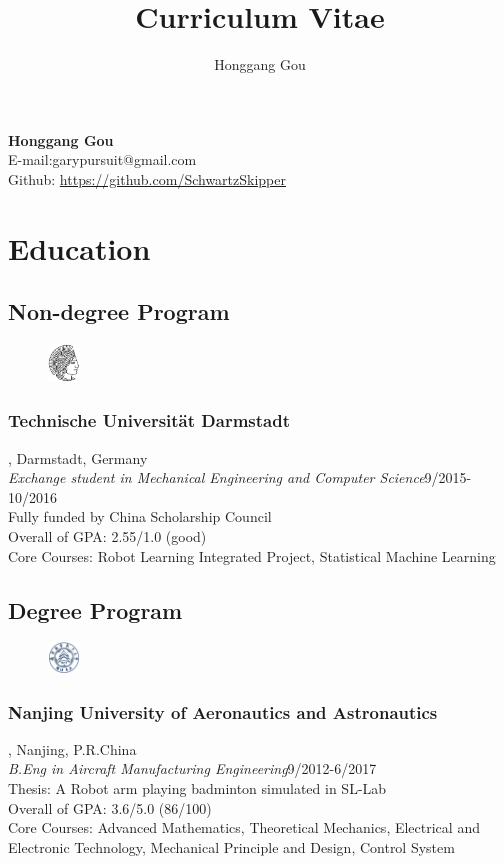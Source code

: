 \documentclass{article}
\makeatletter
\renewcommand{\maketitle}{
\begin{center}
{\Large\bfseries
Honggang Gou\\}
\vspace{0em}
E-mail:garypursuit@gmail.com\\
Github: \url{https://github.com/SchwartzSkipper}
\end{center}
}
\makeatother
\begin{document}
   
\title{Curriculum Vitae}
\author{Honggang Gou}

\maketitle

\section{Education}
\subsection{Non-degree Program}
\begin{figure}
    \begin{center}
        \includegraphics[width=0.075\textwidth]{./pic/tud.png}
    \end{center}
\end{figure}
\subsubsection{Technische Universit\"at Darmstadt}, Darmstadt, Germany\\
\emph{Exchange student in Mechanical Engineering and Computer Science}{\hfill9/2015-10/2016\\}
Fully funded by China Scholarship Council\\
Overall of GPA: 2.55/1.0 (good)\\
Core Courses: Robot Learning Integrated Project, Statistical Machine Learning\\
\subsection{Degree Program}
\begin{figure}
    \begin{center}
        \includegraphics[width=0.075\textwidth]{./pic/NUAA.jpg}
    \end{center}
\end{figure}
\subsubsection{Nanjing University of Aeronautics and Astronautics}
, Nanjing, P.R.China\\
\emph{B.Eng in Aircraft Manufacturing Engineering}{\hfill9/2012-6/2017\\}
Thesis: A Robot arm playing badminton simulated in SL-Lab\\
Overall of GPA: 3.6/5.0 (86/100)\\
Core Courses: Advanced Mathematics, Theoretical Mechanics, Electrical and Electronic Technology, Mechanical Principle and Design, Control System
\end{document}
